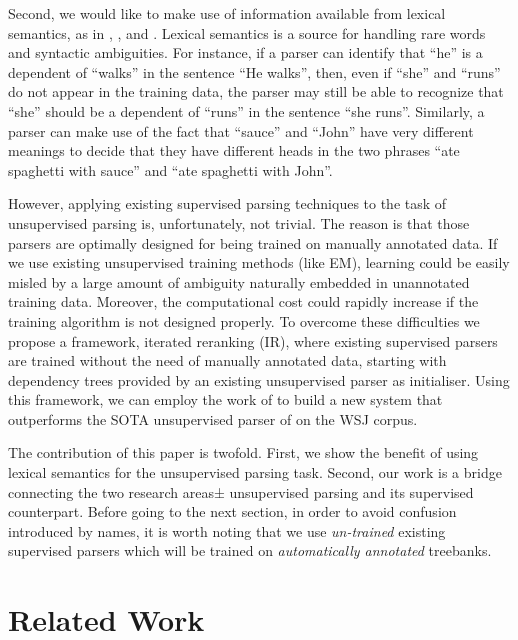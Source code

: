 \documentclass[11pt,letterpaper]{article}
\begin{document}
Second, we would like to make use of information available from lexical semantics, as in 
, , and .
Lexical semantics is a source for handling rare 
words and syntactic ambiguities. For instance, if a parser 
can identify that ``he'' is a dependent of ``walks'' in 
the sentence ``He walks'', then, even if ``she'' and ``runs'' 
do not appear in the training data, the parser may still be able 
to recognize that ``she'' should be a dependent of ``runs'' 
in the sentence ``she runs''. Similarly, a parser can make use of the fact that 
``sauce'' and ``John'' have very different meanings to decide  
that they have different heads 
in the two phrases ``ate spaghetti with sauce'' and 
``ate spaghetti with John''. 

However, applying existing supervised parsing techniques to the task of unsupervised parsing is, unfortunately, not trivial. 
The reason is that those parsers are optimally designed for being trained on 
manually annotated data. 
If we use existing unsupervised training methods (like EM), learning could be easily 
misled by a large amount of ambiguity naturally embedded in unannotated 
training data.
Moreover, the computational cost could rapidly increase 
if the training algorithm is not designed properly.
To overcome these difficulties
we propose a framework, iterated reranking (IR), 
where existing supervised parsers are trained 
without the need of manually annotated data, starting with dependency trees provided by an existing unsupervised parser as initialiser.
Using this framework, we can employ the work of 
to build a new system that outperforms the SOTA
unsupervised parser of 
on the WSJ corpus. 

The contribution of this paper is twofold. First, we show 
the benefit of using lexical semantics for the unsupervised parsing
task. Second, our work is a bridge connecting the two research 
areas± unsupervised parsing and its supervised counterpart. 
Before going to the next section, in order to avoid confusion introduced by names, 
it is worth noting that we use \textit{un-trained} existing supervised parsers
which will be trained on \textit{automatically annotated} treebanks.

\section{Related Work}
\label{section related work}
\end{document}

